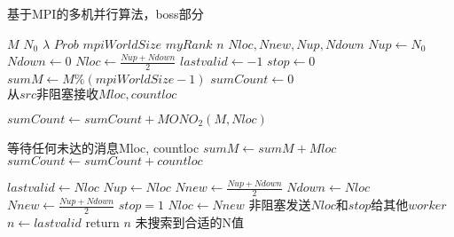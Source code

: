\begin{algorithm}
	\caption{基于MPI的多机并行算法，boss部分}
	\label{alg:mpi}
	\begin{algorithmic}[1]
	  \Require $M$ 
          \Require $N_0$ 
          \Require $\lambda$ 
          \Require $Prob$ 
          \Require $mpiWorldSize$ 
          \Require $myRank$ 
          \Ensure $n$ 
	   
          \State $Nloc, Nnew, Nup, Ndown$ 
           
          \State $Nup \gets N_0$
          \State $Ndown \gets 0$
          \State $Nloc \gets \frac{Nup+Ndown}{2}$
          \State $lastvalid \gets -1$ 
          \State $stop \gets 0$
          \State $sumM \gets M\%(mpiWorldSize-1)$
          \State $sumCount \gets 0$
          \State $从src非阻塞接收Mloc, countloc$
          \EndFor
          
          \State $sumCount \gets sumCount + MONO_2(M, Nloc)$
          \EndFor 
          
          \State 等待任何未达的消息Mloc, countloc
          \State $sumM \gets sumM + Mloc$
          \State $sumCount \gets sumCount + countloc$
          \EndFor
          
          \State $lastvalid \gets Nloc$
          \State $Nup \gets Nloc$
          \State $Nnew \gets \frac{Nup+Ndown}{2}$
          \Else
          \State $Ndown \gets Nloc$
          \State $Nnew \gets \frac{Nup+Ndown}{2}$
          \EndIf
          \State $stop = 1$
          \EndIf
          \State $Nloc \gets Nnew$
          \State $非阻塞发送Nloc和stop给其他worker$
          \EndWhile
          \State $n \gets lastvalid$
          \State return $n$
          \Else
          \State 未搜索到合适的N值
          \EndIf
        \end{algorithmic}
\end{algorithm}
          
